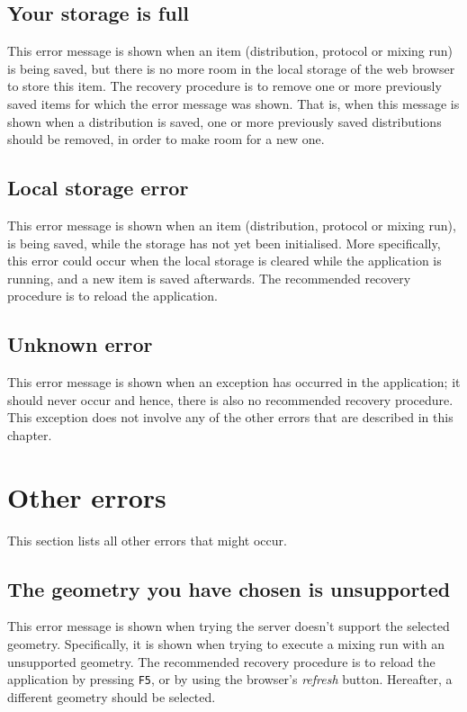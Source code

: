 \subsection{Your storage is full}
This error message is shown when an item (distribution, protocol or mixing run) is being saved, but there is no more room in the local storage of the web browser to store this item. The recovery procedure is to remove one or more previously saved items for which the error message was shown. That is, when this message is shown when a distribution is saved, one or more previously saved distributions should be removed, in order to make room for a new one.

\subsection{Local storage error}
This error message is shown when an item (distribution, protocol or mixing run), is being saved, while the storage has not yet been initialised. More specifically, this error could occur when the local storage is cleared while the application is running, and a new item is saved afterwards. The recommended recovery procedure is to reload the application. 

\subsection{Unknown error}
This error message is shown when an exception has occurred in the application; it should never occur and hence, there is also no recommended recovery procedure. This exception does not involve any of the other errors that are described in this chapter.

\section{Other errors}
This section lists all other errors that might occur.

\subsection{The geometry you have chosen is unsupported}
This error message is shown when trying the server doesn't support the selected geometry. Specifically, it is shown when trying to execute a mixing run with an unsupported geometry. The recommended recovery procedure is to reload the application by pressing \texttt{F5}, or by using the browser's \emph{refresh} button. Hereafter, a different geometry should be selected.

